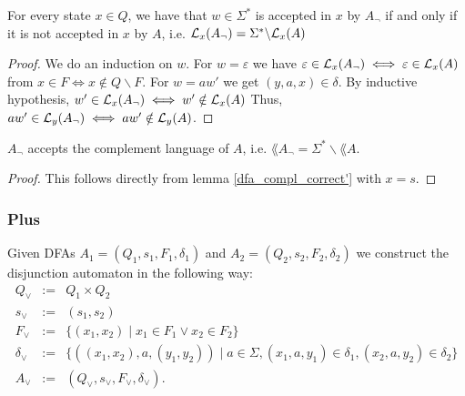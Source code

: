 \begin{lemma}
    \label{dfa_compl_correct'}
    For every state $x \in Q$, we have that $w \in \Sigma^*$ is accepted in $x$ by $A_\neg$ if and only if it is not accepted in $x$ by $A$, i.e. $\mathcal{L}_{x}(A_\neg) = \Sigma^* \backslash \mathcal{L}_{x}(A)$ 
\end{lemma}
\begin{proof}
    We do an induction on $w$.
    For $w = \varepsilon$ we have $\varepsilon \in \mathcal{L}_{x}(A_\neg) \iff \varepsilon \in \mathcal{L}_{x}(A)$ from
    $x \in F \iff x \notin Q\backslash F$.
    For $w = aw'$ we get $(y,a,x) \in \delta$. 
    By inductive hypothesis, $w' \in \mathcal{L}_{x}(A_\neg) \iff w' \notin \mathcal{L}_{x}(A)$
    Thus, $aw' \in \mathcal{L}_{y}(A_\neg) \iff aw' \notin \mathcal{L}_{y}(A)$.
\end{proof}
\begin{lemma}
    $A_\neg$ accepts the complement language of $A$, i.e. $\lang{A_\neg} = \Sigma^* \backslash \lang{A}$.
    \label{dfa_compl_correct}
\end{lemma}
\begin{proof}
    This follows directly from lemma \ref{dfa_compl_correct'} with $x = s$.
\end{proof}

\subsubsection{Plus}
\begin{definition}
    Given DFAs $A_1=(Q_1, s_1, F_1, \delta_1)$ and $A_2=(Q_2, s_2, F_2, \delta_2)$ we construct the disjunction automaton  in the following way:
    \begin{eqnarray*}
        Q_\vee &:=& Q_1 \times Q_2 \\
        s_\vee &:=& (s_1, s_2) \\
        F_\vee &:=& \{(x_1,x_2) \; | \; x_1 \in F_1 \vee x_2 \in F_2\} \\
        \delta_\vee &:=& \{( (x_1, x_2),a,(y_1, y_2)) \; | \; a \in \Sigma, (x_1, a, y_1) \in \delta_1, (x_2, a, y_2) \in \delta_2 \} \\
        A_\vee &:=& (Q_\vee, s_\vee, F_\vee, \delta_\vee).
    \end{eqnarray*}
\end{definition}

